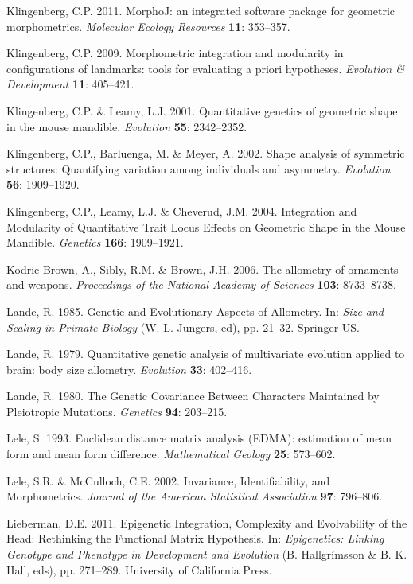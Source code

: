 \documentclass[12pt,twoside]{report}
\begin{document}
Klingenberg, C.P. 2011. MorphoJ: an integrated software package for
geometric morphometrics. \emph{Molecular Ecology Resources} \textbf{11}:
353--357.

Klingenberg, C.P. 2009. Morphometric integration and modularity in
configurations of landmarks: tools for evaluating a priori hypotheses.
\emph{Evolution \& Development} \textbf{11}: 405--421.

Klingenberg, C.P. \& Leamy, L.J. 2001. Quantitative genetics of
geometric shape in the mouse mandible. \emph{Evolution} \textbf{55}:
2342--2352.

Klingenberg, C.P., Barluenga, M. \& Meyer, A. 2002. Shape analysis of
symmetric structures: Quantifying variation among individuals and
asymmetry. \emph{Evolution} \textbf{56}: 1909--1920.

Klingenberg, C.P., Leamy, L.J. \& Cheverud, J.M. 2004. Integration and
Modularity of Quantitative Trait Locus Effects on Geometric Shape in the
Mouse Mandible. \emph{Genetics} \textbf{166}: 1909--1921.

Kodric-Brown, A., Sibly, R.M. \& Brown, J.H. 2006. The allometry of
ornaments and weapons. \emph{Proceedings of the National Academy of
Sciences} \textbf{103}: 8733--8738.

Lande, R. 1985. Genetic and Evolutionary Aspects of Allometry. In:
\emph{Size and Scaling in Primate Biology} (W. L. Jungers, ed), pp.
21--32. Springer US.

Lande, R. 1979. Quantitative genetic analysis of multivariate evolution
applied to brain: body size allometry. \emph{Evolution} \textbf{33}:
402--416.

Lande, R. 1980. The Genetic Covariance Between Characters Maintained by
Pleiotropic Mutations. \emph{Genetics} \textbf{94}: 203--215.

Lele, S. 1993. Euclidean distance matrix analysis (EDMA): estimation of
mean form and mean form difference. \emph{Mathematical Geology}
\textbf{25}: 573--602.

Lele, S.R. \& McCulloch, C.E. 2002. Invariance, Identifiability, and
Morphometrics. \emph{Journal of the American Statistical Association}
\textbf{97}: 796--806.

Lieberman, D.E. 2011. Epigenetic Integration, Complexity and
Evolvability of the Head: Rethinking the Functional Matrix Hypothesis.
In: \emph{Epigenetics: Linking Genotype and Phenotype in Development and
Evolution} (B. Hallgrímsson \& B. K. Hall, eds), pp. 271--289.
University of California Press.
\end{document}
